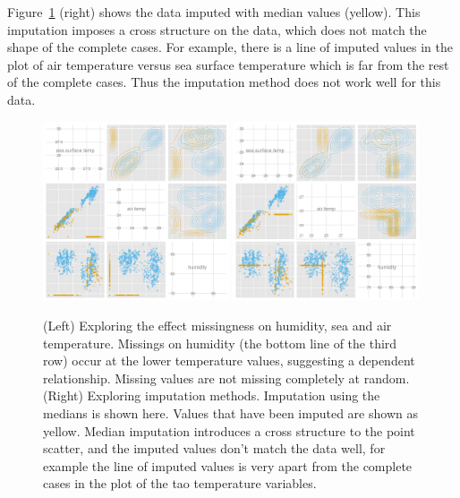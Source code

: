 \documentclass[article]{jss}
\begin{document}
Figure~\ref{fig:tao1} (right) shows the data imputed with median values (yellow). This imputation imposes a cross structure on the data, which does not match the shape of the complete cases. For example, there is a line of imputed values in the plot of air temperature versus sea surface temperature which is far from the rest of the complete cases. Thus the imputation method does not work well for this data.


\begin{figure}[htp]
\centerline{\includegraphics[width=0.49\textwidth]{graph/fig4-3-below10-uncondition}
\includegraphics[width=0.49\textwidth]{graph/fig4-1-median-uncondition}}
\caption{(Left) Exploring the effect missingness on humidity, sea and air temperature. Missings on humidity (the bottom line of the third row) occur at the lower temperature values, suggesting a dependent relationship. Missing values are not missing completely at random. (Right) Exploring imputation methods. Imputation using the medians is shown here. Values that have been imputed are shown as yellow. Median imputation introduces a cross structure to the point scatter, and the imputed values don't match the data well, for example the line of imputed values is very apart from the complete cases in the plot of the tao temperature variables.}
\label{fig:tao1}
\end{figure}
\end{document}

